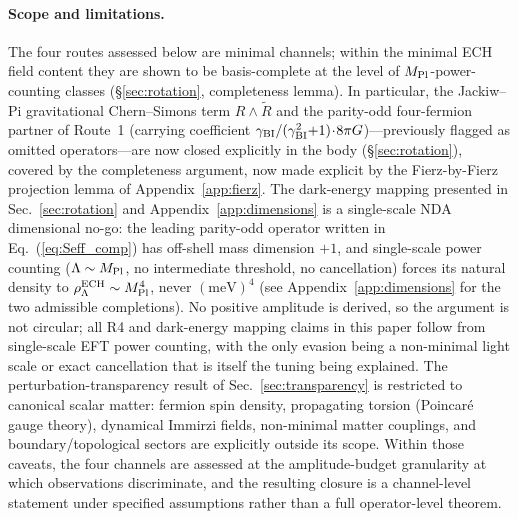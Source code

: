 \documentclass[aps,prd,twocolumn,superscriptaddress,showpacs,preprintnumbers,nofootinbib,longbibliography,floatfix]{revtex4-2}
\newcommand{\MPl}{M_{\rm Pl}}
\begin{document}
\paragraph{Scope and limitations.} The four routes assessed below are
minimal channels; within the minimal ECH field content they are shown to be
basis-complete at the level of $M_{\rm Pl}$-power-counting classes
(\S\ref{sec:rotation}, completeness lemma). In particular, the Jackiw--Pi
gravitational Chern--Simons term $R\!\wedge\!\widetilde R$ and the parity-odd
four-fermion partner of Route~1 (carrying coefficient
$\gamma_{\rm BI}/(\gamma_{\rm BI}^2{+}1)\!\cdot\! 8\pi G$)---previously flagged
as omitted operators---are now closed explicitly in the body
(\S\ref{sec:rotation}), covered by the completeness argument, now made explicit
by the Fierz-by-Fierz projection lemma of Appendix~\ref{app:fierz}. The dark-energy
mapping presented in
Sec.~\ref{sec:rotation} and Appendix~\ref{app:dimensions} is a single-scale
NDA dimensional no-go: the leading parity-odd operator written in
Eq.~(\ref{eq:Seff_comp}) has off-shell mass dimension $+1$, and single-scale
power counting ($\Lambda\sim\MPl$, no intermediate threshold, no cancellation)
forces its natural density to $\rho_\Lambda^{\rm ECH}\sim\MPl^4$, never
$(\text{meV})^4$ (see Appendix~\ref{app:dimensions} for the two admissible
completions). No positive amplitude is derived, so the argument is not
circular; all R4 and dark-energy mapping claims in this paper follow from
single-scale EFT power counting, with the only evasion being a non-minimal
light scale or exact cancellation that is itself the tuning being explained. The perturbation-transparency result of
Sec.~\ref{sec:transparency} is restricted to canonical scalar matter:
fermion spin density, propagating torsion (Poincar\'{e} gauge theory),
dynamical Immirzi fields, non-minimal matter couplings, and
boundary/topological sectors are explicitly outside its scope. Within
those caveats, the four channels are assessed at the amplitude-budget
granularity at which observations discriminate, and the resulting closure
is a channel-level statement under specified assumptions rather than a
full operator-level theorem.
\end{document}
